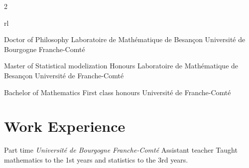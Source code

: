 \documentclass[10pt]{article} %
\begin{document}
\begin{paracol}{2}


\begin{supertabular}{rl} %

	
	{Doctor of Philosophy} %
	{} %
	{Laboratoire de Mathématique de Besançon} %
	{Université de Bourgogne Franche-Comté} %
	
	
	{Master of Statistical modelization} %
	{Honours} %
	{Laboratoire de Mathématique de Besançon} %
	{Université de Franche-Comté} %
	
	
	{Bachelor of Mathematics} %
	{First class honours} %
	{} %
	{Université de Franche-Comté} %
	

\end{supertabular}

\section{Work Experience}




{Part time} %
{\textit{Université de Bourgogne Franche-Comté}} %
{Assistant teacher} %
{Taught mathematics to the 1st years and statistics to the 3rd years.} %


\end{paracol}
\end{document}
